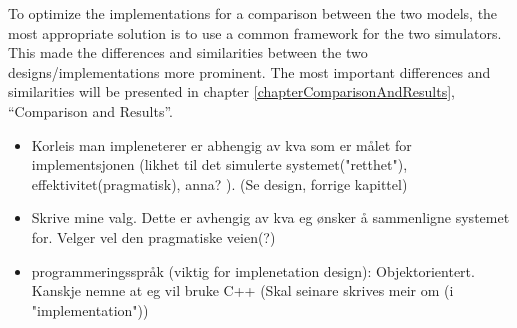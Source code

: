 \documentclass[a4paper,11 pt]{report}
\begin{document}
	To optimize the implementations for a comparison between the two models, the most appropriate solution is to use a common framework for the two simulators.
	This made the differences and similarities between the two designs/implementations more prominent. %
	The most important differences and similarities will be presented in chapter \ref{chapterComparisonAndResults}, ``Comparison and Results''. %

\begin{itemize}
	\item Korleis man impleneterer er abhengig av kva som er målet for implementsjonen (likhet til det simulerte systemet("retthet"), effektivitet(pragmatisk), anna? ). (Se design, forrige kapittel)%
	\item Skrive mine valg. Dette er avhengig av kva eg ønsker å sammenligne systemet for. Velger vel den pragmatiske veien(?)
	\item programmeringsspråk (viktig for implenetation design): Objektorientert. Kanskje nemne at eg vil bruke C++ (Skal seinare skrives meir om (i "implementation"))
\end{itemize}



\end{document}

